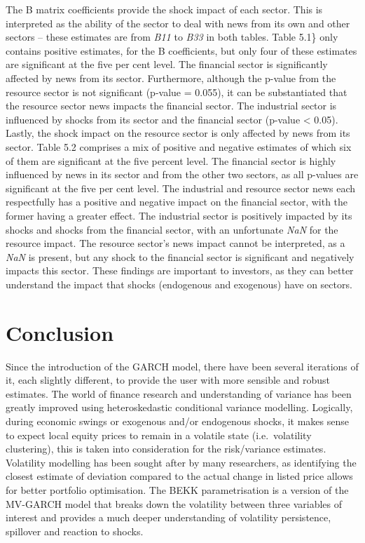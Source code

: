 \documentclass[11pt,preprint, authoryear]{elsarticle}
\numberwithin{equation}{section}
\numberwithin{figure}{section}
\numberwithin{table}{section}
\begin{document}
The B matrix coefficients provide the shock impact of each sector. This
is interpreted as the ability of the sector to deal with news from its
own and other sectors -- these estimates are from \emph{B11} to
\emph{B33} in both tables. Table 5.1\} only contains positive estimates,
for the B coefficients, but only four of these estimates are significant
at the five per cent level. The financial sector is significantly
affected by news from its sector. Furthermore, although the p-value from
the resource sector is not significant (p-value = 0.055), it can be
substantiated that the resource sector news impacts the financial
sector. The industrial sector is influenced by shocks from its sector
and the financial sector (p-value \textless{} 0.05). Lastly, the shock
impact on the resource sector is only affected by news from its sector.
Table 5.2 comprises a mix of positive and negative estimates of which
six of them are significant at the five percent level. The financial
sector is highly influenced by news in its sector and from the other two
sectors, as all p-values are significant at the five per cent level. The
industrial and resource sector news each respectfully has a positive and
negative impact on the financial sector, with the former having a
greater effect. The industrial sector is positively impacted by its
shocks and shocks from the financial sector, with an unfortunate
\emph{NaN} for the resource impact. The resource sector's news impact
cannot be interpreted, as a \emph{NaN} is present, but any shock to the
financial sector is significant and negatively impacts this sector.
These findings are important to investors, as they can better understand
the impact that shocks (endogenous and exogenous) have on sectors.

\hypertarget{conclusion}{%
\section{Conclusion}\label{conclusion}}

Since the introduction of the GARCH model, there have been several
iterations of it, each slightly different, to provide the user with more
sensible and robust estimates. The world of finance research and
understanding of variance has been greatly improved using
heteroskedastic conditional variance modelling. Logically, during
economic swings or exogenous and/or endogenous shocks, it makes sense to
expect local equity prices to remain in a volatile state
(i.e.~volatility clustering), this is taken into consideration for the
risk/variance estimates. Volatility modelling has been sought after by
many researchers, as identifying the closest estimate of deviation
compared to the actual change in listed price allows for better
portfolio optimisation. The BEKK parametrisation is a version of the
MV-GARCH model that breaks down the volatility between three variables
of interest and provides a much deeper understanding of volatility
persistence, spillover and reaction to shocks.
\end{document}
